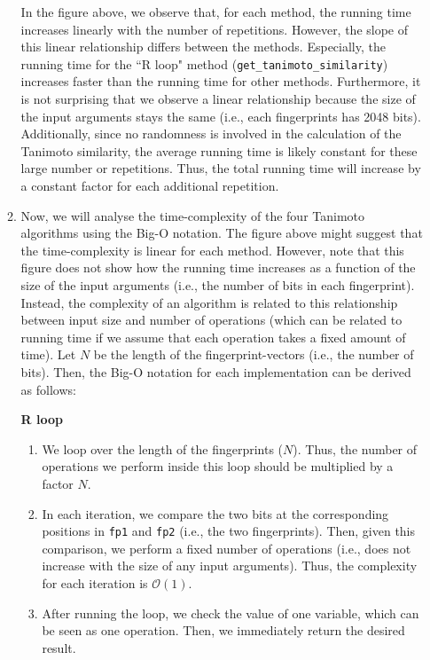 \documentclass[a4paper,11pt]{article}\usepackage[]{graphicx}\usepackage[]{xcolor}
\newenvironment{knitrout}{}{} %
\newcommand{\code}[1]{\texttt{#1}}
\begin{document}
\begin{enumerate}
\begin{enumerate}
\begin{knitrout}
{}


\end{knitrout}

In the figure above, we observe that, for each method, the running time increases linearly with the number of repetitions. However, the slope of this linear relationship differs between the methods. Especially, the running time for the ``R loop" method (\code{get\_tanimoto\_similarity}) increases faster than the running time for other methods. Furthermore, it is not surprising that we observe a linear relationship because the size of the input arguments stays the same (i.e., each fingerprints has 2048 bits). Additionally, since no randomness is involved in the calculation of the Tanimoto similarity, the average running time is likely constant for these large number or repetitions. Thus, the total running time will increase by a constant factor for each additional repetition.




\item Now, we will analyse the time-complexity of the four Tanimoto algorithms using the Big-O notation. The figure above might suggest that the time-complexity is linear for each method. However, note that this figure does not show how the running time increases as a function of the size of the input arguments (i.e., the number of bits in each fingerprint). Instead, the complexity of an algorithm is related to this relationship between input size and number of operations (which can be related to running time if we assume that each operation takes a fixed amount of time). Let $N$ be the length of the fingerprint-vectors (i.e., the number of bits). Then, the Big-O notation for each implementation can be derived as follows: 

\textbf{R loop}
\begin{enumerate}
\item We loop over the length of the fingerprints ($N$). Thus, the number of operations we perform inside this loop should be multiplied by a factor $N$. 

\item In each iteration, we compare the two bits at the corresponding positions in \code{fp1} and \code{fp2} (i.e., the two fingerprints). Then, given this comparison, we perform a fixed number of operations (i.e., does not increase with the size of any input arguments). Thus, the complexity for each iteration is $\mathcal{O}(1)$. 

\item After running the loop, we check the value of one variable, which can be seen as one operation. Then, we immediately return the desired result. 


\end{enumerate}
\end{enumerate}
\end{enumerate}
\end{document}
